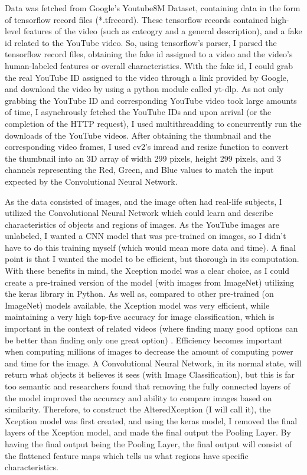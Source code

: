 \documentclass[10pt,twocolumn]{article}
\begin{document}
Data was fetched from Google's Youtube8M Dataset, containing data in the form of tensorflow record files (*.tfrecord). These tensorflow records contained high-level features of the video (such as cateogry and a general description), and a fake id related to the YouTube video. So, using tensorflow's parser, I parsed the tensorflow record files, obtaining the fake id assigned to a video and the video's human-labeled features or overall characteristics. With the fake id, I could grab the real YouTube ID assigned to the video through a link provided by Google, and download the video by using a python module called yt-dlp. As not only grabbing the YouTube ID and corresponding YouTube video took large amounts of time, I asynchrously fetched the YouTube IDs and upon arrival (or the completion of the HTTP request), I used multithreadding to concurrently run the downloads of the YouTube videos. After obtaining the thumbnail and the corresponding video frames, I used cv2's imread and resize function to convert the thumbnail into an 3D array of width 299 pixels, height 299 pixels, and 3 channels representing the Red, Green, and Blue values to match the input expected by the Convolutional Neural Network. 

As the data consisted of images, and the image often had real-life subjects, I utilized the Convolutional Neural Network which could learn and describe characteristics of objects and regions of images. As the YouTube images are unlabeled, I wanted a CNN model that was pre-trained on images, so I didn't have to do this training myself (which would mean more data and time). A final point is that I wanted the model to be efficient, but thorough in its computation. With these benefits in mind, the Xception model was a clear choice, as I could create a pre-trained version of the model (with images from ImageNet) utilizing the keras library in Python. As well as, compared to other pre-trained (on ImageNet) models available, the Xception model was very efficient, while maintaining a very high top-five accuracy for image classification, which is important in the context of related videos (where finding many good options can be better than finding only one great option) \cite{Stancic2022}. Efficiency becomes important when computing millions of images to decrease the amount of computing power and time for the image. A Convolutional Neural Network, in its normal state, will return what objects it believes it sees (with Image Classification), but this is far too semantic and researchers found that removing the fully connected layers of the model improved the accuracy and ability to compare images based on similarity. Therefore, to construct the AlteredXception (I will call it), the Xception model was first created, and using the keras model, I removed the final layers of the Xception model, and made the final output the Pooling Layer. By having the final output being the Pooling Layer, the final output will consist of the flattened feature maps which tells us what regions have specific characteristics.
\end{document}
